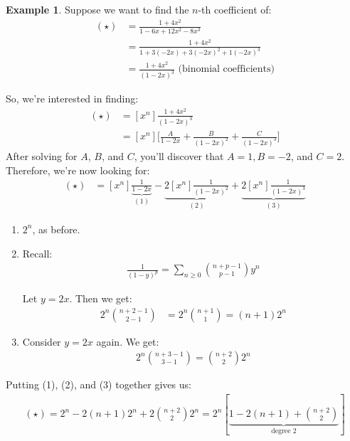 \documentclass[]{article}
\theoremstyle{definition}
\newtheorem{ex}{Example}[section]
\begin{document}
		\begin{ex}
			Suppose we want to find the $n$-th coefficient of:
			\begin{align*}
				(\star) &= \frac{1 + 4x^2}{1 - 6x + 12x^2 - 8x^3} \\
					&= \frac{1 + 4x^2}{1 + 3(-2x) + 3(-2x)^2 + 1(-2x)^3} \\
					&= \frac{1 + 4x^2}{(1 - 2x)^3} \text{ (binomial coefficients)}
			\end{align*}

			So, we're interested in finding:
			\begin{align*}
				[x^n](\star) &= [x^n] \frac{1 + 4x^2}{(1 - 2x)^3} \\
				&= [x^n] \bigg[ \frac{A}{1 - 2x} + \frac{B}{(1 - 2x)^2} + \frac{C}{(1 - 2x)^3} \bigg]
			\end{align*}
			After solving for $A$, $B$, and $C$, you'll discover that $A = 1, B = -2$, and $C = 2$. Therefore, we're now looking for:
			\begin{align*}
				[x^n](\star) &= [x^n] \underbrace{\frac{1}{1 - 2x}}_{(1)} - \underbrace{2[x^n]\frac{1}{(1 - 2x)^2}}_{(2)} + \underbrace{2[x^n] \frac{1}{(1 - 2x)^3}}_{(3)}
			\end{align*}

			\begin{enumerate}
				\item $2^n$, as before.
				\item Recall:
					\begin{align*}
						\frac{1}{(1 - y)^p} = \sum_{n \ge 0} {n + p - 1 \choose p - 1} y^n
					\end{align*}

					Let $y = 2x$. Then we get:
					\begin{align*}
						2^n { n + 2 - 1 \choose 2 - 1} &= 2^n {n + 1 \choose 1} = (n + 1)2^n
					\end{align*}
				\item Consider $y = 2x$ again. We get:
					\begin{align*}
						2^n {n + 3 - 1 \choose 3 - 1} = {n + 2 \choose 2} 2^n
					\end{align*}
			\end{enumerate}

			Putting (1), (2), and (3) together gives us:
			\begin{align*}
				[x^n](\star) = 2^n - 2(n + 1)2^n + 2 { n + 2 \choose 2} 2^n = 2^n[\underbrace{1 - 2(n + 1) + {n + 2 \choose 2}}_{\text{degree 2}}]
			\end{align*}
		\end{ex}
\end{document}
